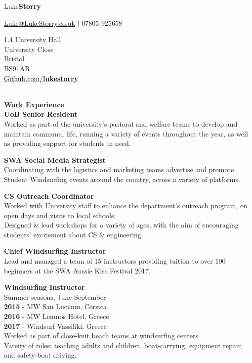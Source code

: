 \documentclass[10pt]{article}
\newcommand{\sect}[1]{{\LARGE{\textbf{#1}}}\vspace{0.1em}\\}
\newcommand{\xx}[2]{{\large\textbf{#1}}\\{#2}\vspace{0.5em}}
\begin{document}
\begin{center}
{\Huge{{Luke}\textbf{Storry}}}

{\large \href{mailto:Luke@LukeStorry.co.uk}{Luke@LukeStorry.co.uk} $|$ 07805 925658}\\

{\textcolor{linecol}\hrulefill}
\end{center}
%
%
%
%
%
%
\begin{minipage}[t]{0.33\textwidth} %
1.4 University Hall\\University Close\\Bristol\\BS91AR
\vspace{0.5em}\\
\href{https://github.com/lukestorry}{Github.com/\textbf{lukestorry}} \\
\\
\raggedright
\sect{Work Experience}
\xx{UoB Senior Resident}
{Worked as part of the university's pastoral and welfare teams to develop and maintain communal life, %
running a variety of events throughout the year, as well as providing support for students in need.}

\xx{SWA Social Media Strategist}
{Coordinating with the logistics and marketing teams advertise and promote Student Windsurfing events around the country, across a variety of platforms.}

\xx{CS Outreach Coordinator}{Worked with University staff to enhance the department's outreach program, on open days and visits to local schools. \\
Designed \& lead workshops for a variety of ages, with the aim of encouraging students' excitement about CS \& engineering.}

\xx{Chief Windsurfing Instructor}
{Lead and managed a team of 15 instructors providing tuition to over 100 beginners at the SWA Aussie Kiss Festival 2017.}

\xx{Windsurfing Instructor}
{Summer seasons, June-September\\
\textbf{2015} - MW San Lucianu, Corsica\\
\textbf{2016} - MW Lemnos Hotel, Greece\\
\textbf{2017} - Windsurf Vassiliki, Greece\\
Worked as part of close-knit beach teams at windsurfing centers\\
Vareity of roles: teaching adults and children, boat-carrying, equipment repair, and safety-boat driving.}




\end{minipage}
\end{document}
